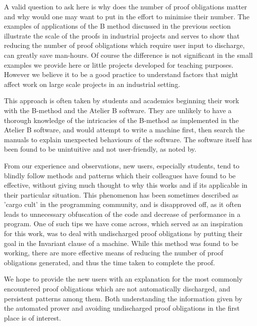 \documentclass[11pt,journal]{IEEEtran}
\begin{document}
	A valid question to ask here is why does the number of proof obligations matter and why would one may want to put in the effort to minimise their number. The examples of applications of the B method discussed in the previous section illustrate the scale of the proofs in industrial projects and serves to show that reducing the number of proof obligations which require user input to discharge, can greatly save man-hours. Of course the difference is not significant in the small examples we provide here or little projects developed for teaching purposes. However we believe it to be a good practice to understand factors that might affect work on large scale projects in an industrial setting.
	
	This approach is often taken by students and academics beginning their work with the B-method and the Atelier B software. They are unlikely to have a thorough knowledge of the intricacies of the B-method as implemented in the Atelier B software, and would attempt to write a machine first, then search the manuals to explain unexpected behaviours of the software. The software itself has been found to be unintuitive and not user-friendly, as noted by\cite{San Juan metro}.
	
	From our experience and observations, new users, especially students, tend to blindly follow methods and patterns which their colleagues have found to be effective, without giving much thought to why this works and if its applicable in their particular situation. This phenomenon has been sometimes described as 'cargo cult' in the programming community\cite{Cargo culting}, and is disapproved off, as it often leads to unnecessary obfuscation of the code and decrease of performance in a program. One of such tips we have come across, which served as an inspiration for this work, was to deal with undischarged proof obligations by putting their goal in the Invariant clause of a machine. While this method was found to be working, there are more effective means of reducing the number of proof obligations generated, and thus the time taken to complete the proof.
	
	We hope to provide the new users with an explanation for the most commonly encountered proof obligations which are not automatically discharged, and persistent patterns among them. Both understanding the information given by the automated prover and avoiding undischarged proof obligations in the first place is of interest.
	
\end{document}

